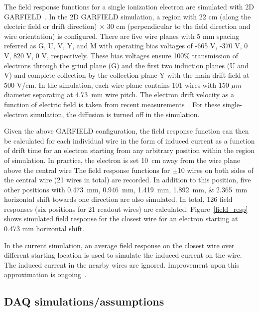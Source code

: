 The field response functions for a single ionization electron are simulated with 2D GARFIELD~\cite{garfield}.
In the 2D GARFIELD simulation, a region with 22 cm (along the electric field or drift direction) $\times$ 30 cm (perpendicular to the field direction and wire orientation) is configured. There are five wire planes
with 5 mm spacing referred as G, U, V, Y, and M with operating bias voltages of -665 V, -370 V, 0 V, 820 V, 0 V, respectively.  These bias voltages ensure 100\% transmission of electrons through the griud plane (G) and the first two induction planes (U and V) and complete collection by the collection plane Y with the main drift field at 500 V/cm. 
  In the simulation, each wire plane contains 101 wires with 150 $\mu m$ diameter
  separating at \SI{4.73}{\mm} wire pitch. The electron drift velocity as a function of electric
  field is taken from recent measurements~\cite{Li:2015rqa,ref:lar_property}. For these
  single-electron simulation, the diffusion is turned off in the simulation. 

 Given the above GARFIELD configuration, the field response function can then be calculated
  for each individual wire in the form of induced current as a function of drift time for an
  electron starting from any arbitrary position within the region of simulation. 
  In practice, the electron is set \SI{10}{\cm} away from the wire plane above the central wire 
  The field response functions
  for $\pm$10 wires on both sides of the central wire (21 wires in total) are recorded.
  In addition to this position, five other positions with
  \SIlist{0.473;0.946;1.419;1.892;2.365}{\mm} horizontal shift towards one direction are also simulated.
  In total, 126 field responses (six positions for 21 readout wires) are calculated.
  Figure~\ref{field_resp} shows simulated field response for the closest wire for an electron starting at 
  0.473 mm horizontal shift. 
  
  In the current simulation, an average field response on the closest wire over different starting location is
  used to simulate the induced current on the wire. The induced current in the nearby wires are ignored. 
  Improvement upon this approximation is ongoing~\cite{ref:full_simulation}. 


\subsection{DAQ simulations/assumptions}
\label{sec:tools-mc-daq}

